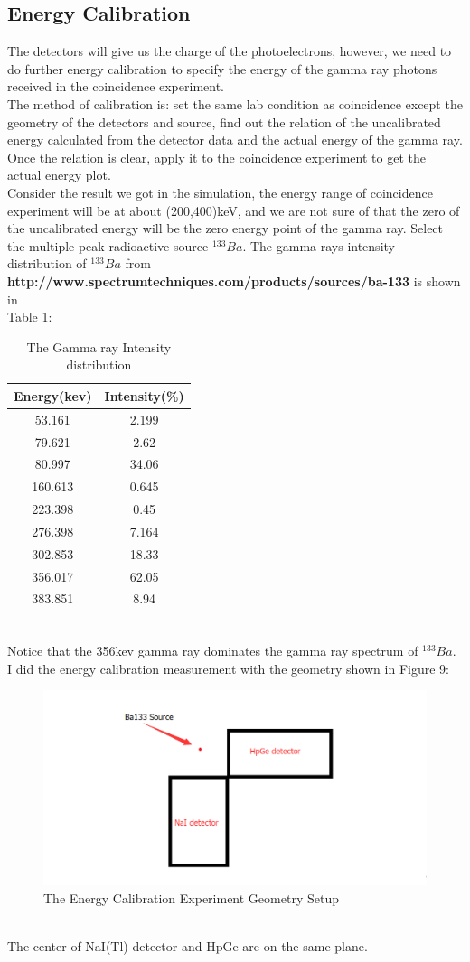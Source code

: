 \documentclass[12pt]{article}
\begin{document}
	\subsection{Energy Calibration}
	The detectors will give us the charge of the photoelectrons, however, we need to do further energy calibration to specify the energy of the gamma ray photons received in the coincidence experiment.\\
	The method of calibration is: set the same lab condition as coincidence except the geometry of the detectors and source, find out the relation of the uncalibrated energy calculated from the detector data  and the actual energy of the gamma ray. Once the relation is clear, apply it to the coincidence experiment to get the actual energy plot.\\
	Consider the result  we got in the simulation, the energy range of coincidence experiment will be at about (200,400)keV, and we are not sure of that the zero of the uncalibrated energy will be the zero energy point of the gamma ray. Select the multiple peak radioactive source $^{133}Ba$. The gamma rays intensity distribution of $^{133}Ba$ from \\\textbf{http://www.spectrumtechniques.com/products/sources/ba-133} is shown in\\Table 1:
	\begin{table}[ht]
		\centering
		\begin{tabular}{|c|c|}\hline
			Energy(kev)& Intensity(\%)\\\hline
			53.161&	2.199\\
			79.621&	2.62\\
			80.997&	34.06\\
			160.613&	0.645\\
			223.398	&0.45\\
			276.398	&7.164\\
			302.853&	18.33\\
			356.017	&62.05\\
			383.851	&8.94\\\hline
		\end{tabular}
		\caption{The Gamma ray Intensity distribution}
	\end{table}\\
	Notice that the 356kev gamma ray dominates the gamma ray spectrum of $^{133}Ba$. \\
	I did the energy calibration measurement with the geometry shown in Figure 9:
	\begin{figure}[h]
		\centering
		\includegraphics[width=0.7\linewidth, height=0.15\textheight]{pic/calibration_geo}
		\caption{The Energy Calibration Experiment Geometry Setup}
		\label{fig:calibrationgeo}
	\end{figure}\\
	The center of NaI(Tl) detector and HpGe are on the same plane.
\end{document}
